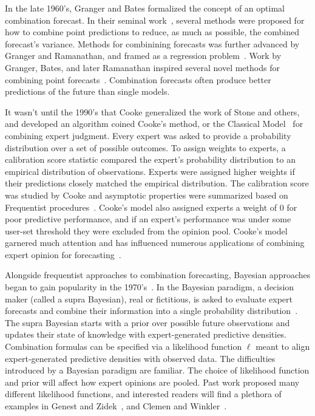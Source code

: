\documentclass[preprint]{elsarticle}
\begin{document}
In the late 1960's, Granger and Bates formalized the concept of an optimal combination forecast.
In their seminal work~\cite{bates1969combination}, several methods were proposed for how to combine point predictions to reduce, as much as possible, the combined forecast's variance.
Methods for combinining forecasts was further advanced by Granger and Ramanathan, and framed as a regression problem~\cite{granger1984improved}.
Work by Granger, Bates, and later Ramanathan inspired several novel methods for combining point forecasts~\cite{gneiting2013combining,hora2015calibration,cooke1991experts,wallis2011combining}.
Combination forecasts often produce better predictions of the future than single models.

It wasn't until the 1990's that Cooke generalized the work of Stone and others, and developed an algorithm coined Cooke's method, or the Classical Model~\cite{cooke1988calibration,cooke1991experts} for combining expert judgment.
Every expert was asked to provide a probability distribution over a set of possible outcomes.
To assign weights to experts, a calibration score statistic compared the expert's probability distribution to an empirical distribution of observations.
Experts were assigned higher weights if their predictions closely matched the empirical distribution.
The calibration score was studied by Cooke and asymptotic properties were summarized based on Frequentist procedures~\cite{cooke1988calibration,cooke2015aggregation}.
Cooke's model also assigned experts a weight of $0$ for poor predictive performance, and
if an expert's performance was under some user-set threshold they were excluded from the opinion pool.
Cooke's model garnered much attention and has influenced numerous applications of combining expert opinion for forecasting~\cite{cooke2014validating,clemen2008comment,cooke2015aggregation}.

Alongside frequentist approaches to combination forecasting, Bayesian approaches began to gain popularity in the 1970's~\cite{morris1974decision}.
In the Bayesian paradigm, a decision maker (called a supra Bayesian), real or fictitious, is asked to evaluate expert forecasts and combine their information into a single probability distribution~\cite{hogarth1975cognitive,keeney1976group}.
The supra Bayesian starts with a prior over possible future observations and updates their state of knowledge with expert-generated predictive densities.
Combination formulas can be specified via a likelihood function $\ell$ meant to align expert-generated predictive densities with observed data.
The difficulties introduced by a Bayesian paradigm are familiar.
The choice of likelihood function and prior will affect how expert opinions are pooled. 
Past work proposed many different likelihood functions, and interested readers will find a plethora of examples in Genest and Zidek~\cite{genest1986combining}, and Clemen and Winkler~\cite{clemen1999combining,clemen1986combining,clemen1989combining}.
\end{document}
